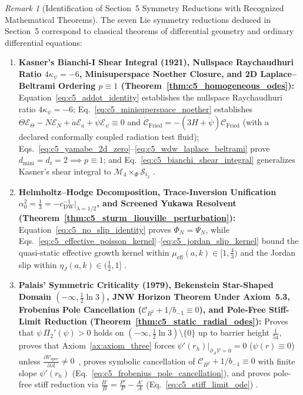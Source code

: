 \documentclass[11pt,a4paper]{article}
\newcommand{\catD}{\text{\textbf{\textcolor{blue!75!black}{[D]}}}}
\theoremstyle{definition}
\theoremstyle{plain}
\theoremstyle{remark}
\newtheorem{remark}[axiom]{Remark}
\begin{document}
\begin{remark}[{Identification of Section~5 Symmetry Reductions with Recognized Mathematical Theorems}]\label{rem:c5_symmetry_recognition}
The seven Lie symmetry reductions deduced in Section~5 correspond to classical theorems of differential geometry and ordinary differential equations:
\begin{enumerate}
  \item \textbf{Kasner's Bianchi-I Shear Integral (1921), Nullspace Raychaudhuri Ratio $4\kappa_\psi = -6$, Minisuperspace Noether Closure, and 2D Laplace--Beltrami Ordering $p \equiv 1$ (Theorem~\ref{thm:c5_homogeneous_odes}):} Equation~\eqref{eq:c5_addot_identity} establishes the nullspace Raychaudhuri ratio $4\kappa_\psi = -6$; Eq.~\eqref{eq:c5_minisuperspace_noether} establishes $\dot{\Theta}\mathcal{E}_\Theta - N\dot{\mathcal{E}}_N + \dot{a}\mathcal{E}_a + \dot{\psi}\mathcal{E}_\psi \equiv 0$ and $\dot{\mathcal{C}}_{\mathrm{Fried}} = -(3H + \dot{\psi})\mathcal{C}_{\mathrm{Fried}}$ (with a declared conformally coupled radiation test fluid); Eqs.~\eqref{eq:c5_yamabe_2d_zero}--\eqref{eq:c5_wdw_laplace_beltrami} prove $d_{\mathrm{mini}} = d_t = 2 \implies p \equiv 1$; and Eq.~\eqref{eq:c5_bianchi_shear_integral} generalizes Kasner's shear integral to $\mathcal{M}_4 \times_\Phi \mathcal{S}_{t_2}$ \catD.
  \item \textbf{Helmholtz--Hodge Decomposition, Trace-Inversion Unification $\alpha_0^2 = \frac{1}{3} = -c_{\mathrm{DW}}^{-1}\big|_{\lambda=1/2}$, and Screened Yukawa Resolvent (Theorem~\ref{thm:c5_sturm_liouville_perturbation}):} Equation~\eqref{eq:c5_no_slip_identity} proves $\Phi_N = \Psi_N$, while Eqs.~\eqref{eq:c5_effective_poisson_kernel}--\eqref{eq:c5_jordan_slip_kernel} bound the quasi-static effective growth kernel within $\mu_{\mathrm{eff}}(a, k) \in [1, \frac{4}{3})$ and the Jordan slip within $\eta_J(a, k) \in (\frac{1}{2}, 1]$ \catD.
  \item \textbf{Palais' Symmetric Criticality (1979), Bekenstein Star-Shaped Domain $(-\infty, \frac{1}{2}\ln 3)$, JNW Horizon Theorem Under Axiom~5.3, Frobenius Pole Cancellation ($\mathcal{C}_{B^2} + 1/b_{-1} \equiv 0$), and Pole-Free Stiff-Limit Reduction (Theorem~\ref{thm:c5_static_radial_odes}):} Proves that $\psi\,\Pi_2'(\psi) > 0$ holds on $(-\infty, \frac{1}{2}\ln 3)\setminus\{0\}$ up to barrier height $\frac{1}{54}$, proves that Axiom~\ref{ax:axiom_three} forces $\left.\psi'(r_h)\right|_{\partial_{\mathcal{A}}\mathcal{V}=0} = 0$ ($\psi(r) \equiv 0$) unless $\frac{\partial\mathcal{V}_{\mathrm{spec}}}{\partial\mathcal{A}} \neq 0$~\cite{Palais1979,JNW1968,Bekenstein1972}, proves symbolic cancellation of $\mathcal{C}_{B^2} + 1/b_{-1} \equiv 0$ with finite slope $\psi'(r_h)$ (Eq.~\ref{eq:c5_frobenius_pole_cancellation}), and proves pole-free stiff reduction via $\frac{B'}{B} = \frac{P'}{P} - \frac{A'}{A}$ (Eq.~\ref{eq:c5_stiff_limit_ode}) \catD.

\end{enumerate}
\end{remark}
\end{document}
